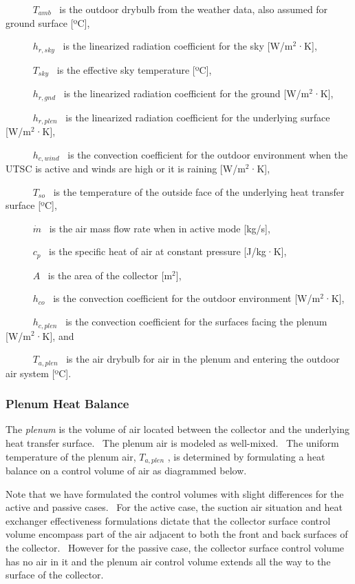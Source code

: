 ~~~~~ \({T_{amb}}\) ~is the outdoor drybulb from the weather data, also assumed for ground surface {[}ºC{]},

~~~~~ \({h_{r,sky}}\) ~is the linearized radiation coefficient for the sky {[}W/m\(^{2}\)·K{]},

~~~~~ \({T_{sky}}\) ~is the effective sky temperature {[}ºC{]},

~~~~~ \({h_{r,gnd}}\) ~is the linearized radiation coefficient for the ground {[}W/m\(^{2}\)·K{]},

~~~~~ \({h_{r,plen}}\) ~is the linearized radiation coefficient for the underlying surface {[}W/m\(^{2}\)·K{]},

~~~~~ \({h_{c,wind}}\) ~is the convection coefficient for the outdoor environment when the UTSC is active and winds are high or it is raining {[}W/m\(^{2}\)·K{]},

~~~~~ \({T_{so}}\) ~is the temperature of the outside face of the underlying heat transfer surface {[}ºC{]},

~~~~~ \(\dot m\) ~is the air mass flow rate when in active mode {[}kg/s{]},

~~~~~ \({c_p}\) ~is the specific heat of air at constant pressure {[}J/kg·K{]},

~~~~~ \(A\) ~is the area of the collector {[}m\(^{2}\){]},

~~~~~ \({h_{co}}\) ~is the convection coefficient for the outdoor environment {[}W/m\(^{2}\)·K{]},

~~~~~ \({h_{c,plen}}\) ~is the convection coefficient for the surfaces facing the plenum {[}W/m\(^{2}\)·K{]}, and

~~~~~ \({T_{a,plen}}\) ~is the air drybulb for air in the plenum and entering the outdoor air system {[}ºC{]}.

\subsubsection{Plenum Heat Balance}\label{plenum-heat-balance}

The \emph{plenum} is the volume of air located between the collector and the underlying heat transfer surface.~ The plenum air is modeled as well-mixed.~ The uniform temperature of the plenum air, \({T_{a,plen}}\) , is determined by formulating a heat balance on a control volume of air as diagrammed below.

Note that we have formulated the control volumes with slight differences for the active and passive cases.~ For the active case, the suction air situation and heat exchanger effectiveness formulations dictate that the collector surface control volume encompass part of the air adjacent to both the front and back surfaces of the collector.~ However for the passive case, the collector surface control volume has no air in it and the plenum air control volume extends all the way to the surface of the collector.

